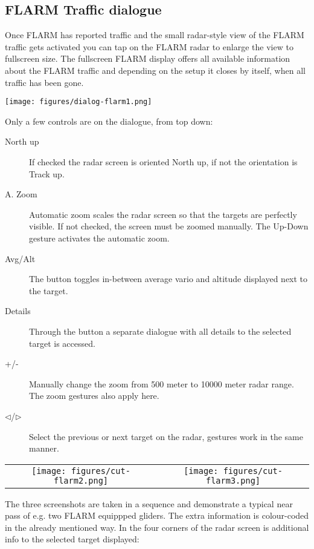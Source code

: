 \subsection*{FLARM Traffic dialogue}\label{sec:flarm-traffic}

Once FLARM has reported traffic and the small radar-style view of the FLARM
traffic gets activated   you can tap on the FLARM radar to
enlarge the view to fullscreen size.  
The fullscreen FLARM display offers all available information
about the FLARM traffic and depending on the setup it closes by itself, when all
traffic has been gone.

\begin{center}
\texttt{[image: figures/dialog-flarm1.png]}
\end{center}

Only a few controls are on the dialogue, from top down:
\begin{description}
\item[North up]  If checked the radar screen is oriented North up, if not the
orientation is Track up.
\item[A. Zoom]   Automatic zoom scales the radar screen so
that the targets are perfectly visible. If not checked, the screen must be
zoomed manually. The Up-Down gesture activates the automatic zoom. 
\item[Avg/Alt]   The button toggles in-between average
vario and altitude displayed next to the target.
\item[Details]   Through the button a separate dialogue with
all details to the selected target is accessed. 
\item[+/-]   Manually change the zoom from 500 meter to
10000 meter radar range. The zoom gestures also apply here.
\item[$\triangleleft$/$\triangleright$]   Select the
previous or next target on the radar, gestures work in the same manner.
\end{description}

\begin{center}
\begin{tabular}{c c}
\texttt{[image: figures/cut-flarm2.png]}&
\texttt{[image: figures/cut-flarm3.png]}\\
\end{tabular}
\end{center}
The three screenshots are taken in a sequence and demonstrate a typical near
pass of e.g. two FLARM equippped gliders. The extra information is colour-coded
in the already mentioned way. In the four corners of the radar screen is
additional info to the selected target displayed:

